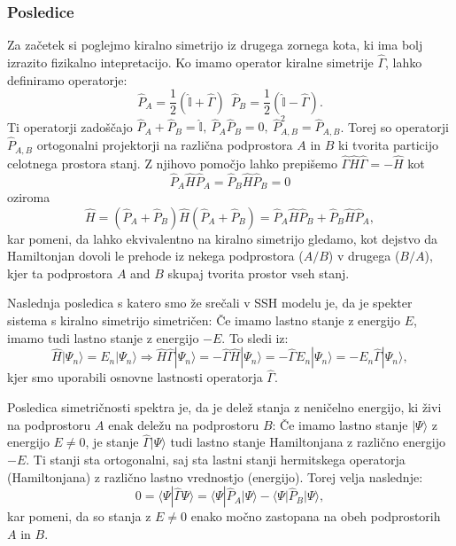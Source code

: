\subsubsection{Posledice}
Za začetek si poglejmo kiralno simetrijo iz drugega zornega kota, ki ima bolj izrazito fizikalno intepretacijo. Ko imamo operator kiralne simetrije $\hat{\Gamma}$, lahko definiramo operatorje:
\begin{equation}
\hat{P}_A = \frac{1}{2} ( \hat{\mathbb{I}} + \hat{\Gamma}) \ \ \hat{P}_B = \frac{1}{2} (\hat{\mathbb{I}} - \hat{\Gamma}).
\end{equation}
Ti operatorji zadoščajo $\hat{P}_A + \hat{P}_B = \hat{\mathbb{I}},\  \hat{P}_A \hat{P}_B = 0,\  \hat{P}_{A,B}^2 = \hat{P}_{A,B}$. Torej so operatorji $\hat{P}_{A,B}$ ortogonalni projektorji na različna podprostora $A$ in $B$ ki tvorita particijo celotnega prostora stanj.
Z njihovo pomočjo lahko prepišemo $\hat{\Gamma} \hat{H} \hat{\Gamma} = -\hat{H}$ kot
\begin{equation}
\hat{P}_A \hat{H} \hat{P}_A = \hat{P}_B \hat{H} \hat{P}_B = 0
\end{equation}
oziroma
\begin{equation}
 \hat{H} = \left( \hat{P}_A + \hat{P}_B \right) \hat{H}  \left( \hat{P}_A + \hat{P}_B \right)  = \hat{P}_A \hat{H} \hat{P}_B + \hat{P}_B \hat{H} \hat{P}_A,
\end{equation}
kar pomeni, da lahko ekvivalentno na kiralno simetrijo gledamo, kot dejstvo da Hamiltonjan dovoli le prehode iz nekega podprostora ($A/B$) v drugega ($B/A$), kjer ta podprostora $A$ and $B$ skupaj tvorita prostor vseh stanj.

Naslednja posledica s katero smo že srečali v SSH modelu je, da je spekter sistema s kiralno simetrijo simetričen: Če imamo lastno stanje z energijo $E$, imamo tudi lastno stanje z energijo $-E$. To sledi iz:
\begin{equation}
\hat{H} | \Psi_n \rangle = E_n | \Psi_n \rangle  \Rightarrow \hat{H} \hat{\Gamma} |\Psi_n \rangle = - \hat{\Gamma} \hat{H} | \Psi_n \rangle = - \hat{\Gamma} E_n | \Psi_n \rangle = - E_n \hat{\Gamma} | \Psi_n \rangle,
\end{equation}
kjer smo uporabili osnovne lastnosti operatorja $\hat{\Gamma}$. 

Posledica simetričnosti spektra je, da je delež stanja z neničelno energijo, ki živi na podprostoru $A$ enak deležu na podprostoru $B$: Če imamo lastno stanje $| \Psi \rangle$ z energijo $E \neq 0$, je stanje $\hat{\Gamma} | \Psi \rangle$ tudi lastno stanje Hamiltonjana z različno energijo $-E$. Ti stanji sta ortogonalni, saj sta lastni stanji hermitskega operatorja (Hamiltonjana) z različno lastno vrednostjo (energijo). Torej velja naslednje:
\begin{equation}
0 = \langle \Psi | \hat{\Gamma}  \Psi \rangle = \langle \Psi | \hat{P}_A | \Psi \rangle - \langle \Psi | \hat{P}_B | \Psi \rangle,
\end{equation}
kar pomeni, da so stanja z $E \neq 0$ enako močno zastopana na obeh podprostorih $A$ in $B$.

